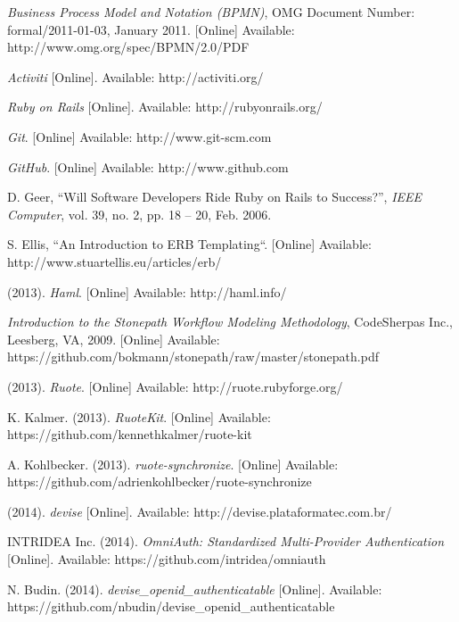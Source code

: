 \renewcommand{\bibname}{References}
\begin{thebibliography}{99}

\raggedright

\textit{Business Process Model and Notation
(BPMN)}, OMG Document Number: formal/2011-01-03, January 2011. [Online] Available: http://www.omg.org/spec/BPMN/2.0/PDF

\textit{Activiti} [Online]. Available: http://activiti.org/

\textit{Ruby on Rails} [Online]. Available: http://rubyonrails.org/

\textit{Git}. [Online] Available: http://www.git-scm.com

\textit{GitHub}. [Online] Available: http://www.github.com

D. Geer, ``Will Software Developers Ride Ruby on Rails to Success?'', \textit{IEEE Computer}, vol. 39, no. 2, pp. 18 -- 20, Feb. 2006.

S. Ellis, ``An Introduction to ERB Templating``. [Online] Available: http://www.stuartellis.eu/articles/erb/

(2013). \textit{Haml}. [Online] Available: http://haml.info/

\textit{Introduction to the Stonepath Workflow Modeling Methodology},
CodeSherpas Inc., Leesberg, VA, 2009. [Online] Available: https://github.com/bokmann/stonepath/raw/master/stonepath.pdf

(2013). \textit{Ruote}. [Online] Available: http://ruote.rubyforge.org/

K. Kalmer. (2013). \textit{RuoteKit}. [Online] Available: https://github.com/kennethkalmer/ruote-kit

A. Kohlbecker. (2013). \textit{ruote-synchronize}. [Online] Available: https://github.com/adrienkohlbecker/ruote-synchronize

(2014). \textit{devise} [Online]. Available: http://devise.plataformatec.com.br/

INTRIDEA Inc. (2014). \textit{OmniAuth: Standardized Multi-Provider Authentication} [Online]. Available: https://github.com/intridea/omniauth

N. Budin. (2014). \textit{devise\_openid\_authenticatable} [Online]. Available: https://github.com/nbudin/devise\_openid\_authenticatable


\end{thebibliography}
